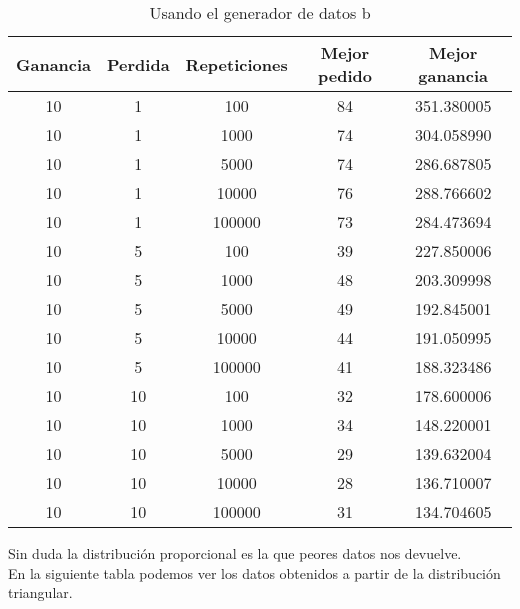\documentclass[12pt,a4paper]{article}
\begin{document}
\begin{table}[H]
	\begin{tabular}{ccccc} \toprule
		{Ganancia} & {Perdida} & {Repeticiones} & {Mejor pedido} & {Mejor ganancia} \\ \midrule
		10  & 1 & 100 & 84 & 351.380005 \\
		10  & 1 & 1000 & 74 & 304.058990 \\
		10  & 1 & 5000 & 74 & 286.687805 \\
		10  & 1 & 10000 & 76 & 288.766602 \\
		10  & 1 & 100000 & 73 & 284.473694 \\ \midrule
		
		10  & 5 & 100 & 39 & 227.850006 \\
		10  & 5 & 1000 & 48 & 203.309998 \\
		10  & 5 & 5000 & 49 & 192.845001\\
		10  & 5 & 10000 & 44 & 191.050995\\
		10  & 5 & 100000 & 41 & 188.323486 \\ \midrule
		
		10  & 10 & 100 & 32 & 178.600006 \\
		10  & 10 & 1000 & 34 & 148.220001 \\
		10  & 10 & 5000 & 29 & 139.632004 \\
		10  & 10 & 10000 & 28 & 136.710007 \\
		10  & 10 & 100000 & 31 & 134.704605\\ \midrule	
	\end{tabular}
	\caption{Usando el generador de datos b} \label{tab:genDataB}
\end{table}
Sin duda la distribución proporcional es la que peores datos nos devuelve. \\
En la siguiente tabla podemos ver los datos obtenidos a partir de la distribución triangular.
\end{document}
